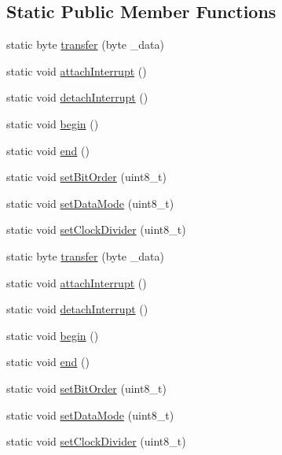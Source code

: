 \subsection*{\-Static \-Public \-Member \-Functions}
\begin{DoxyCompactItemize}
\item 
static byte \hyperlink{class_s_p_i_class_a821dccd5dda20ccd9093fc35cce74ae5}{transfer} (byte \-\_\-data)
\item 
static void \hyperlink{class_s_p_i_class_a715dff0f3f87dbb64b2ef83d15ee97c0}{attach\-Interrupt} ()
\item 
static void \hyperlink{class_s_p_i_class_abf83d2ea70e46aed0dd278011e1e8741}{detach\-Interrupt} ()
\item 
static void \hyperlink{class_s_p_i_class_a4a2646959a242f6af423b04734c003f0}{begin} ()
\item 
static void \hyperlink{class_s_p_i_class_a79d89d8e3f5f1b003cb7b0aed2d77eab}{end} ()
\item 
static void \hyperlink{class_s_p_i_class_aa50f88614cda319d2d983749b9a7626d}{set\-Bit\-Order} (uint8\-\_\-t)
\item 
static void \hyperlink{class_s_p_i_class_ae7e89ec7f26a6412fb2d218db331195d}{set\-Data\-Mode} (uint8\-\_\-t)
\item 
static void \hyperlink{class_s_p_i_class_ac364a8e46c27d1f6d94a58e9a2455c62}{set\-Clock\-Divider} (uint8\-\_\-t)
\item 
static byte \hyperlink{class_s_p_i_class_a0cf2bc1318b6de489f17e8da7fcf07ee}{transfer} (byte \-\_\-data)
\item 
static void \hyperlink{class_s_p_i_class_afbdbcf7f1360c567aabd7afa8905fb69}{attach\-Interrupt} ()
\item 
static void \hyperlink{class_s_p_i_class_a4a5eec76f907eef2b8d40fc4a3032327}{detach\-Interrupt} ()
\item 
static void \hyperlink{class_s_p_i_class_a63d644ab0913bc49e72332073c04a7f6}{begin} ()
\item 
static void \hyperlink{class_s_p_i_class_af04f770202944526bf78d8b432ebe285}{end} ()
\item 
static void \hyperlink{class_s_p_i_class_a579800a29b677248c0a5b5794ff4aded}{set\-Bit\-Order} (uint8\-\_\-t)
\item 
static void \hyperlink{class_s_p_i_class_ae2707d596e9270603ce1f844b013cb76}{set\-Data\-Mode} (uint8\-\_\-t)
\item 
static void \hyperlink{class_s_p_i_class_a986d43aa4ba44b4505ec3d663e6049a7}{set\-Clock\-Divider} (uint8\-\_\-t)
\end{DoxyCompactItemize}


